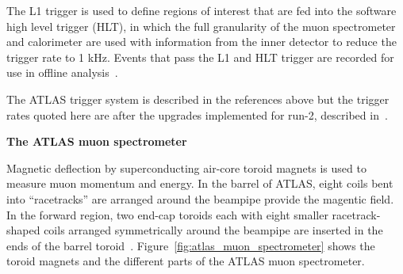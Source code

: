 The L1 trigger is used to define regions of interest that are fed into the software high level trigger (HLT), in which the full granularity of the muon spectrometer and calorimeter are used with information from the inner detector to reduce the trigger rate to 1 kHz. Events that pass the L1 and HLT trigger are recorded for use in offline analysis~\cite{atlas_hlt_trigger_tdr}.

The ATLAS trigger system is described in the references above but the trigger rates quoted here are after the upgrades implemented for run-2, described in~\cite{martinez_run-2_2016}.

\textbf{The ATLAS muon spectrometer}

Magnetic deflection by superconducting air-core toroid magnets is used to measure muon momentum and energy. In the barrel of ATLAS, eight coils bent into ``racetracks'' are arranged around the beampipe provide the magentic field. In the forward region, two end-cap toroids each with eight smaller racetrack-shaped coils arranged symmetrically around the beampipe are inserted in the ends of the barrel toroid~\cite{atlas_magnet_tdr}. Figure~\ref{fig:atlas_muon_spectrometer} shows the toroid magnets and the different parts of the ATLAS muon spectrometer.

